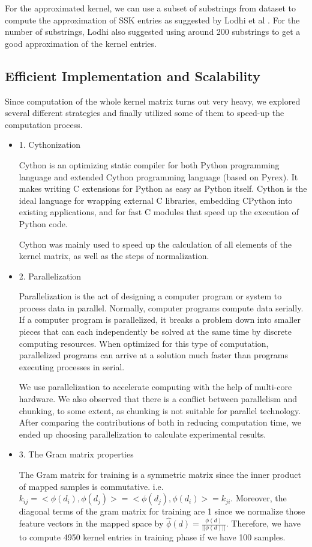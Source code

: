 \documentclass{article}
\begin{document}
For the approximated kernel, we can use a subset of substrings from dataset to compute the approximation of SSK entries as suggested by Lodhi et al \cite{1}. For the number of substrings, Lodhi also suggested using around 200 substrings to get a good approximation of the kernel entries.

\FloatBarrier
\subsection{Efficient Implementation and Scalability}

Since computation of the whole kernel matrix turns out very heavy, we explored several different strategies and finally utilized some of them to speed-up the computation process.
\begin{itemize}
    \item{1. Cythonization}

    Cython is an optimizing static compiler for both Python programming language and extended Cython programming language (based on Pyrex). It makes writing C extensions for Python as easy as Python itself. Cython is the ideal language for wrapping external C libraries, embedding CPython into existing applications, and for fast C modules that speed up the execution of Python code.

    Cython was mainly used to speed up the calculation of all elements of the kernel matrix, as well as the steps of normalization.

    \item{2. Parallelization}

    Parallelization is the act of designing a computer program or system to process data in parallel. Normally, computer programs compute data serially. If a computer program is parallelized, it breaks a problem down into smaller pieces that can each independently be solved at the same time by discrete computing resources. When optimized for this type of computation, parallelized programs can arrive at a solution much faster than programs executing processes in serial.

    We use parallelization to accelerate computing with the help of multi-core hardware. We also observed that there is a conflict between parallelism and chunking, to some extent, as chunking is not suitable for parallel technology. After comparing the contributions of both in reducing computation time, we ended up choosing parallelization to calculate experimental results.

    \item{3. The Gram matrix properties}

    The Gram matrix for training is a symmetric matrix since the inner product of mapped samples is commutative.
    i.e. $k_{ij} = <\phi(d_i), \phi(d_j)> = <\phi(d_j), \phi(d_i)> = k_{ji}$.
    Moreover, the diagonal terms of the gram matrix for training are 1 since we normalize those feature vectors in the mapped space by $\hat{\phi}(d) = \frac{\phi(d)}{||\phi(d)||}$. Therefore, we have to compute 4950 kernel entries in training phase if we have 100 samples.
\end{itemize}
\end{document}

